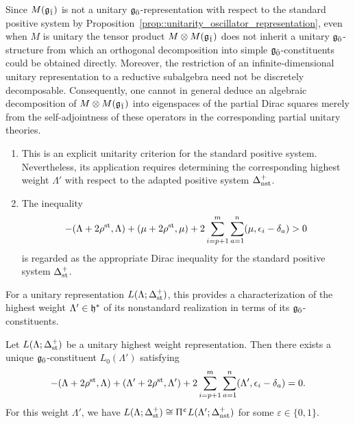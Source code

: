 \begin{remark}
Since $M({\mathfrak{g}_{\bar{1}}})$ is not a unitary ${\mathfrak{g}_{\bar{0}}}$-representation with respect to the standard positive system by Proposition~\ref{prop::unitarity_oscillator_representation}, even when $M$ is unitary the tensor product
$
M\otimes M({\mathfrak{g}_{\bar{1}}})
$
does not inherit a unitary ${\mathfrak{g}_{\bar{0}}}$-structure from which an orthogonal decomposition into simple ${\mathfrak{g}_{\bar{0}}}$-constituents could be obtained directly. Moreover, the restriction of an infinite-dimensional unitary representation to a reductive subalgebra need not be discretely decomposable. Consequently, one cannot in general deduce an algebraic decomposition of $M\otimes M({\mathfrak{g}_{\bar{1}}})$ into eigenspaces of the partial Dirac squares merely from the self-adjointness of these operators in the corresponding partial unitary theories.
\end{remark}
\fi 

\begin{remark} \begin{enumerate}
 \item[(a)] This is an explicit unitarity criterion for the standard positive system. Nevertheless, its application requires determining the corresponding highest weight $\Lambda'$ with respect to the adapted positive system $\Delta_{{\text{nst}}}^{+}$. 
 \item[(b)] The inequality \[
 -(\Lambda+2\rho^{{\text{st}}},\Lambda)
 +(\mu+2\rho^{{\text{st}}},\mu)
 +2\sum_{i=p+1}^{m}\sum_{a=1}^{n}
 (\mu,\epsilon_i-\delta_a)
 >0\]
 is regarded as the appropriate Dirac inequality for the standard positive system $\Delta^{+}_{{\text{st}}}$.
\end{enumerate}
\end{remark}

For a unitary representation $L(\Lambda;\Delta_{{\text{st}}}^{+})$, this
provides a characterization of the highest weight
$\Lambda'\in{\mathfrak h}^{\ast}$ of its nonstandard realization in terms
of its ${\mathfrak{g}_{\bar{0}}}$-constituents.

\begin{corollary}\label{cor::finding_Lambda'}
Let $L(\Lambda;\Delta_{{\text{st}}}^{+})$ be a unitary highest weight
representation. Then there exists a unique ${\mathfrak{g}_{\bar{0}}}$-constituent
$L_0(\Lambda')$ satisfying
\[
-(\Lambda+2\rho^{{\text{st}}},\Lambda)
+(\Lambda'+2\rho^{{\text{st}}},\Lambda')
+2\sum_{i=p+1}^{m}\sum_{a=1}^{n}
(\Lambda',\epsilon_i-\delta_a)
=0.
\]
For this weight $\Lambda'$, we have
$
L(\Lambda;\Delta_{{\text{st}}}^{+})
\cong
 \Uppi^{\upepsilon}L(\Lambda';\Delta_{{\text{nst}}}^{+})
$
for some $\varepsilon\in\{0,1\}$.
\end{corollary}

